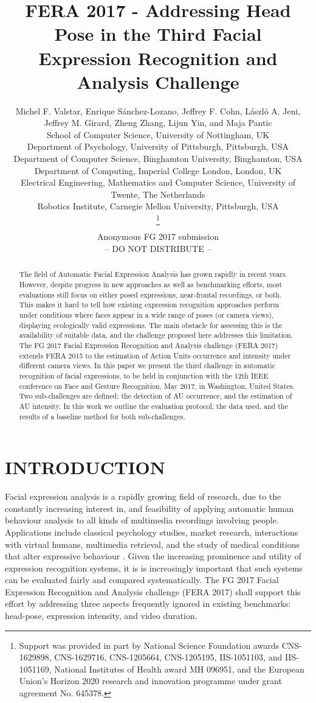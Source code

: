 \documentclass[a4paper, 10pt, conference]{ieeeconf}      \usepackage{FG2017}
\title{\LARGE \bf
FERA 2017 - Addressing Head Pose in the Third Facial Expression Recognition and Analysis Challenge
}
\author{\parbox{16cm}{\centering
    {\large Michel F. Valstar, Enrique S\'anchez-Lozano, Jeffrey F. Cohn, L{\'a}szl{\'o} A. Jeni,\\Jeffrey M. Girard, Zheng Zhang, Lijun Yin, and Maja Pantic}\\
    {\normalsize
     School of Computer Science, University of Nottingham, UK\\
     Department of Psychology, University of Pittsburgh, Pittsburgh, USA\\
       Department of Computer Science, Binghamton University, Binghamton, USA\\
        Department of Computing, Imperial College London, London, UK\\
          Electrical Engineering, Mathematics and Computer Science, University of Twente, The Netherlands\\
          Robotics Institute, Carnegie Mellon University, Pittsburgh, USA}}
    \thanks{Support was provided in part by National Science Foundation awards CNS-1629898, CNS-1629716, CNS-1205664, CNS-1205195, IIS-1051103, and IIS-1051169, National Institutes of Health award MH 096951, and the European Union's Horizon 2020 research and innovation programme under grant agreement No. 645378.}}
\begin{document}
\ifFGfinal
\thispagestyle{empty}
\pagestyle{empty}
\else
\author{Anonymous FG 2017 submission\\-- DO NOT DISTRIBUTE --\\}
\pagestyle{plain}
\fi
\maketitle



\begin{abstract}
The field of Automatic Facial Expression Analysis has grown rapidly in recent years. However, despite progress in new approaches as well as benchmarking efforts, most evaluations still focus on either posed expressions, near-frontal recordings, or both. This makes it hard to tell how existing expression recognition approaches perform under conditions where faces appear in a wide range of poses (or camera views), displaying ecologically valid expressions. The main obstacle for assessing this is the availability of suitable data, and the challenge proposed here addresses this limitation. The FG 2017 Facial Expression Recognition and Analysis challenge (FERA 2017) extends FERA 2015 to the estimation of Action Units occurrence and intensity under different camera views. In this paper we present the third challenge in automatic recognition of facial expressions, to be held in conjunction with the 12th IEEE conference on Face and Gesture Recognition, May 2017, in Washington, United States. Two sub-challenges are defined: the detection of AU occurrence, and the estimation of AU intensity. In this work we outline the evaluation protocol, the data used, and the results of a baseline method for both sub-challenges.

\end{abstract}



\section{INTRODUCTION}

\noindent Facial expression analysis is a rapidly growing field of research, due to the constantly increasing interest in, and feasibility of applying automatic human behaviour analysis to all kinds of multimedia recordings involving people. Applications include classical psychology studies, market research, interactions with virtual humans, multimedia retrieval, and the study of medical conditions that alter expressive behaviour \cite{Valstar2014_ABU}. Given the increasing prominence and utility of expression recognition systems, it is is increasingly important that such systems can be evaluated fairly and compared systematically. The FG 2017 Facial Expression Recognition and Analysis challenge (FERA 2017) shall support this effort by addressing three aspects frequently ignored in existing benchmarks: head-pose, expression intensity, and video duration.
\end{document}
